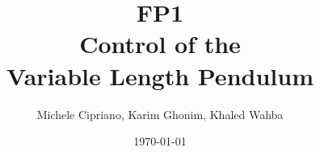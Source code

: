 \documentclass[a4paper]{article}
\begin{document}
\sloppy %


\title{FP1\\Control of the\\Variable Length Pendulum}								%
\author{Michele Cipriano, Karim Ghonim, Khaled Wahba}								%
\date{\today}											%

\makeatletter
\let\thetitle\@title
\let\theauthor\@author
\let\thedate\@date
\makeatother
\end{document}
